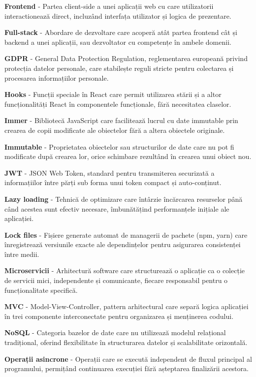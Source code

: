 \documentclass[12pt,a4paper]{report}
\begin{document}
\textbf{Frontend} - Partea client-side a unei aplicații web cu care utilizatorii interactionează direct, incluzând interfața utilizator și logica de prezentare.

\textbf{Full-stack} - Abordare de dezvoltare care acoperă atât partea frontend cât și backend a unei aplicații, sau dezvoltator cu competențe în ambele domenii.

\textbf{GDPR} - General Data Protection Regulation, reglementarea europeană privind protecția datelor personale, care stabilește reguli stricte pentru colectarea și procesarea informațiilor personale.

\textbf{Hooks} - Funcții speciale în React care permit utilizarea stării și a altor funcționalități React în componentele funcționale, fără necesitatea claselor.

\textbf{Immer} - Bibliotecă JavaScript care facilitează lucrul cu date immutable prin crearea de copii modificate ale obiectelor fără a altera obiectele originale.

\textbf{Immutable} - Proprietatea obiectelor sau structurilor de date care nu pot fi modificate după crearea lor, orice schimbare rezultând în crearea unui obiect nou.

\textbf{JWT} - JSON Web Token, standard pentru transmiterea securizată a informațiilor între părți sub forma unui token compact și auto-conținut.

\textbf{Lazy loading} - Tehnică de optimizare care întârzie încărcarea resurselor până când acestea sunt efectiv necesare, îmbunătățind performanțele inițiale ale aplicației.

\textbf{Lock files} - Fișiere generate automat de managerii de pachete (npm, yarn) care înregistrează versiunile exacte ale dependințelor pentru asigurarea consistenței între medii.

\textbf{Microservicii} - Arhitectură software care structurează o aplicație ca o colecție de servicii mici, independente și comunicante, fiecare responsabil pentru o funcționalitate specifică.

\textbf{MVC} - Model-View-Controller, pattern arhitectural care separă logica aplicației în trei componente interconectate pentru organizarea și menținerea codului.

\textbf{NoSQL} - Categoria bazelor de date care nu utilizează modelul relațional tradițional, oferind flexibilitate în structurarea datelor și scalabilitate orizontală.

\textbf{Operații asincrone} - Operații care se execută independent de fluxul principal al programului, permițând continuarea execuției fără așteptarea finalizării acestora.
\end{document}
